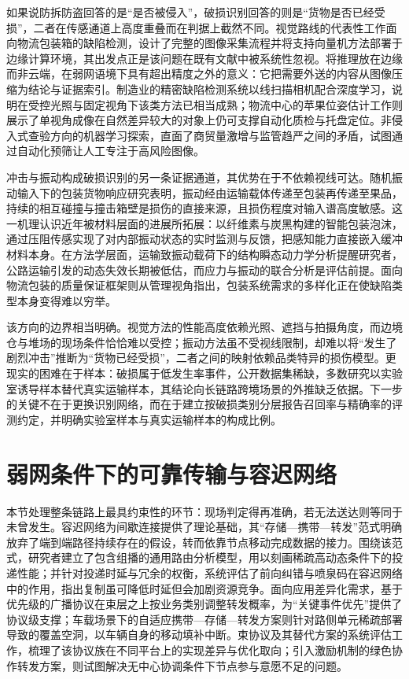\documentclass[11pt,a4paper]{article}
\begin{document}
如果说防拆防盗回答的是“是否被侵入”，破损识别回答的则是“货物是否已经受损”，二者在传感通道上高度重叠而在判据上截然不同。视觉路线的代表性工作面向物流包装箱的缺陷检测，设计了完整的图像采集流程并将支持向量机方法部署于边缘计算环境，其出发点正是该问题在既有文献中被系统性忽视\cite{doiaccess20202984539}。将推理放在边缘而非云端，在弱网语境下具有超出精度之外的意义：它把需要外送的内容从图像压缩为结论与证据索引。制造业的精密缺陷检测系统以线扫描相机配合深度学习，说明在受控光照与固定视角下该类方法已相当成熟\cite{doiapp142412054}；物流中心的苹果位姿估计工作则展示了单视角成像在自然差异较大的对象上仍可支撑自动化质检与托盘定位\cite{doipr7070424}。非侵入式查验方向的机器学习探索，直面了商贸量激增与监管趋严之间的矛盾，试图通过自动化预筛让人工专注于高风险图像\cite{doi122222765}。

冲击与振动构成破损识别的另一条证据通道，其优势在于不依赖视线可达。随机振动输入下的包装货物响应研究表明，振动经由运输载体传递至包装再传递至果品，持续的相互碰撞与撞击箱壁是损伤的直接来源，且损伤程度对输入谱高度敏感\cite{doijbe2008331045}。这一机理认识近年被材料层面的进展所拓展：以纤维素与炭黑构建的智能包装泡沫，通过压阻传感实现了对内部振动状态的实时监测与反馈，把感知能力直接嵌入缓冲材料本身\cite{doijijbiomac2026152058}。在方法学层面，运输致振动载荷下的结构瞬态动力学分析提醒研究者，公路运输引发的动态失效长期被低估，而应力与振动的联合分析是评估前提\cite{doisym17081182}。面向物流包装的质量保证框架则从管理视角指出，包装系统需求的多样化正在使缺陷类型本身变得难以穷举\cite{doilogistics7040082}。

该方向的边界相当明确。视觉方法的性能高度依赖光照、遮挡与拍摄角度，而边境仓与堆场的现场条件恰恰难以受控；振动方法虽不受视线限制，却难以将“发生了剧烈冲击”推断为“货物已经受损”，二者之间的映射依赖品类特异的损伤模型。更现实的困难在于样本：破损属于低发生率事件，公开数据集稀缺，多数研究以实验室诱导样本替代真实运输样本，其结论向长链路跨境场景的外推缺乏依据。下一步的关键不在于更换识别网络，而在于建立按破损类别分层报告召回率与精确率的评测约定，并明确实验室样本与真实运输样本的构成比例。

\section{弱网条件下的可靠传输与容迟网络}

本节处理整条链路上最具约束性的环节：现场判定得再准确，若无法送达则等同于未曾发生。容迟网络为间歇连接提供了理论基础，其“存储—携带—转发”范式明确放弃了端到端路径持续存在的假设，转而依靠节点移动完成数据的接力\cite{doiiccnc20126167525}。围绕该范式，研究者建立了包含组播的通用路由分析模型，用以刻画稀疏高动态条件下的投递性能\cite{doichinacom20116158204}；并针对投递时延与冗余的权衡，系统评估了前向纠错与喷泉码在容迟网络中的作用，指出复制虽可降低时延但会加剧资源竞争\cite{doitnet20102091968}。面向应用差异化需求，基于优先级的广播协议在束层之上按业务类别调整转发概率，为“关键事件优先”提供了协议级支撑\cite{doiwcnc20094917536}；车载场景下的自适应携带—存储—转发方案则针对路侧单元稀疏部署导致的覆盖空洞，以车辆自身的移动填补中断\cite{doilcomm2013022713130123}。束协议及其替代方案的系统评估工作，梳理了该协议族在不同平台上的实现差异与优化取向\cite{doi97808570984672139}；引入激励机制的绿色协作转发方案，则试图解决无中心协调条件下节点参与意愿不足的问题\cite{doipimrc20167794849}。
\end{document}
